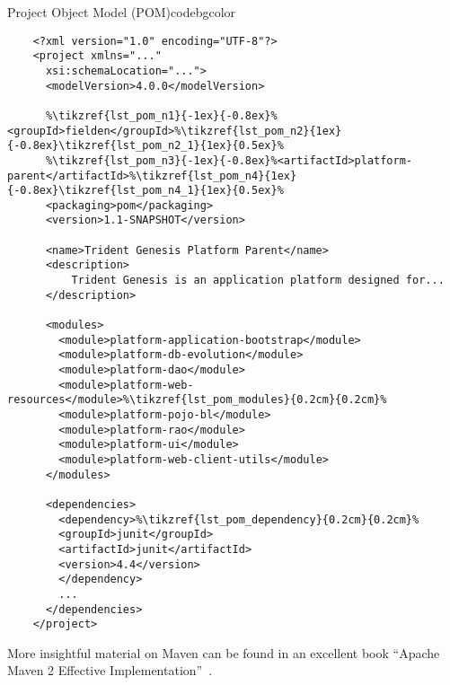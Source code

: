   \begin{code}{Project Object Model (POM)}{\label{lst:pom}}{codebgcolor}
    \begin{lstlisting}
    <?xml version="1.0" encoding="UTF-8"?>
    <project xmlns="..."
	  xsi:schemaLocation="...">
	  <modelVersion>4.0.0</modelVersion>

	  %\tikzref{lst_pom_n1}{-1ex}{-0.8ex}%<groupId>fielden</groupId>%\tikzref{lst_pom_n2}{1ex}{-0.8ex}\tikzref{lst_pom_n2_1}{1ex}{0.5ex}%
	  %\tikzref{lst_pom_n3}{-1ex}{-0.8ex}%<artifactId>platform-parent</artifactId>%\tikzref{lst_pom_n4}{1ex}{-0.8ex}\tikzref{lst_pom_n4_1}{1ex}{0.5ex}%
	  <packaging>pom</packaging>
	  <version>1.1-SNAPSHOT</version>

	  <name>Trident Genesis Platform Parent</name>
	  <description>
	      Trident Genesis is an application platform designed for...
	  </description>

	  <modules>
		<module>platform-application-bootstrap</module>
		<module>platform-db-evolution</module>
		<module>platform-dao</module>
		<module>platform-web-resources</module>%\tikzref{lst_pom_modules}{0.2cm}{0.2cm}%
		<module>platform-pojo-bl</module>
		<module>platform-rao</module>
		<module>platform-ui</module>
		<module>platform-web-client-utils</module>
	  </modules>

	  <dependencies>
	    <dependency>%\tikzref{lst_pom_dependency}{0.2cm}{0.2cm}%
		<groupId>junit</groupId>
		<artifactId>junit</artifactId>
		<version>4.4</version>
	    </dependency>
	    ...
	  </dependencies>
    </project> 
    \end{lstlisting}
  \end{code}

  More insightful material on Maven can be found in an excellent book ``Apache Maven 2 Effective Implementation''~\cite{PoCh2009}.